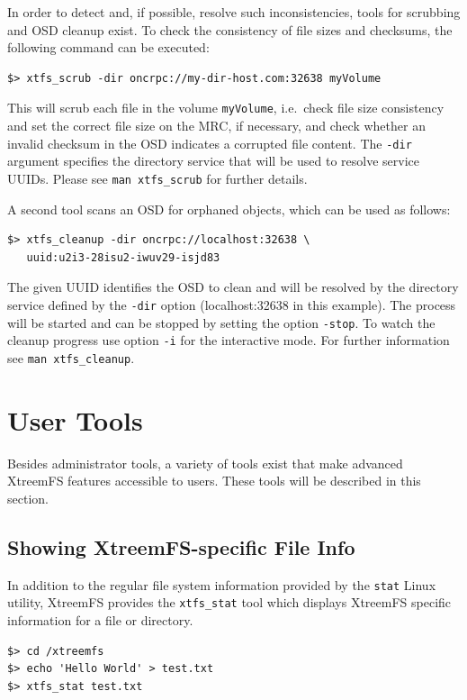 \documentclass[a4paper,10pt]{book}
\begin{document}
In order to detect and, if possible, resolve such inconsistencies, tools for scrubbing and OSD cleanup exist. To check the consistency of file sizes and checksums, the following command can be executed:

\begin{verbatim}
$> xtfs_scrub -dir oncrpc://my-dir-host.com:32638 myVolume
\end{verbatim}

This will scrub each file in the volume \texttt{myVolume}, i.e.\ check file size consistency and set the correct file size on the MRC, if necessary, and check whether an invalid checksum in the OSD indicates a corrupted file content. The \texttt{-dir} argument specifies the directory service that will be used to resolve service UUIDs. Please see \texttt{man xtfs\_scrub} for further details.

A second tool scans an OSD for orphaned objects, which can be used as follows:

\begin{verbatim}
$> xtfs_cleanup -dir oncrpc://localhost:32638 \
   uuid:u2i3-28isu2-iwuv29-isjd83
\end{verbatim}
The given UUID identifies the OSD to clean and will be resolved by the
directory service defined by the \texttt{-dir} option (localhost:32638 in this example).
The process will be started and can be stopped by setting the option
\texttt{-stop}. To watch the cleanup progress use option \texttt{-i} for the
interactive mode. For further information see \texttt{man xtfs\_cleanup}.

\section{User Tools}

Besides administrator tools, a variety of tools exist that make advanced XtreemFS features accessible to users. These tools will be described in this section.

\subsection{Showing XtreemFS-specific File Info}

In addition to the regular file system information provided by the \texttt{stat} Linux utility, XtreemFS provides the \texttt{xtfs\_stat} tool which displays XtreemFS specific information for a file or directory.


\begin{verbatim}
$> cd /xtreemfs
$> echo 'Hello World' > test.txt
$> xtfs_stat test.txt
\end{verbatim}
\end{document}
